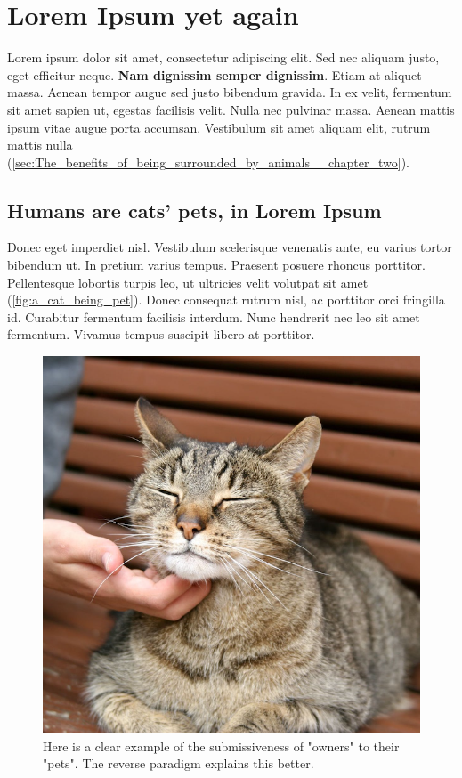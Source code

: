 \chapter{Lorem Ipsum yet again}
\label{sec:Lorem_Ipsum_yet_again__chapter_one}

Lorem ipsum dolor sit amet, consectetur adipiscing elit. Sed nec aliquam justo, eget efficitur neque. \textbf{Nam dignissim semper dignissim}. Etiam at aliquet massa. Aenean tempor augue sed justo bibendum gravida. In ex velit, fermentum sit amet sapien ut, egestas facilisis velit. Nulla nec pulvinar massa. Aenean mattis ipsum vitae augue porta accumsan. Vestibulum sit amet aliquam elit, rutrum mattis nulla (\autoref{sec:The_benefits_of_being_surrounded_by_animals__chapter_two}).

\section{Humans are cats' pets, in Lorem Ipsum}
\label{sec:Humans_are_cats'_pets,_in_Lorem_Ipsum__chapter_one}
Donec eget imperdiet nisl. Vestibulum scelerisque venenatis ante, eu varius tortor bibendum ut. In pretium varius tempus. Praesent posuere rhoncus porttitor. Pellentesque lobortis turpis leo, ut ultricies velit volutpat sit amet (\autoref{fig:a_cat_being_pet}). Donec consequat rutrum nisl, ac porttitor orci fringilla id. Curabitur fermentum facilisis interdum. Nunc hendrerit nec leo sit amet fermentum. Vivamus tempus suscipit libero at porttitor.

\begin{figure}[H]
	\centering
	\includegraphics[width=0.4\linewidth]{Figures/cat.png}
	\caption{Here is a clear example of the submissiveness of "owners" to their "pets". The reverse paradigm explains this better.
}
	\label{fig:a_cat_being_pet}
\end{figure}

